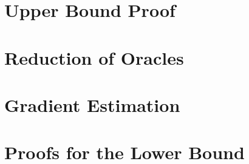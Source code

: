 
\section{Upper Bound Proof}
\label{sec:appendix-md}


\section{Reduction of Oracles}


\section{Gradient Estimation}
\label{sec:appendix-grad}


\section{Proofs for the Lower Bound}
\label{sec:appendix-lb-proof}



